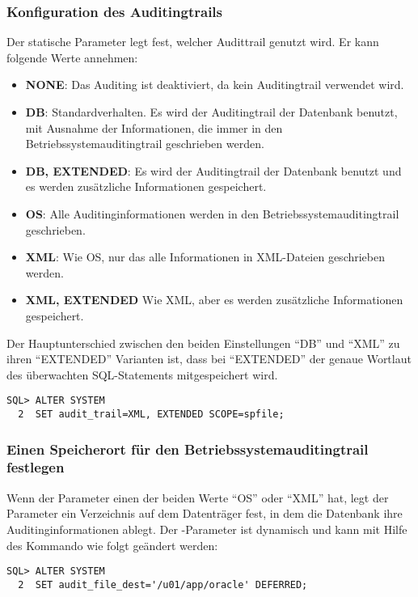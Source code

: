         \subsubsection{Konfiguration des Auditingtrails}
          Der statische Parameter  legt fest, welcher Audittrail genutzt wird. Er kann folgende Werte annehmen:
          \begin{itemize}
            \item \textbf{NONE}: Das Auditing ist deaktiviert, da kein Auditingtrail verwendet wird.
            \item \textbf{DB}: Standardverhalten. Es wird der Auditingtrail der Datenbank benutzt, mit Ausnahme der Informationen, die immer in den Betriebssystemauditingtrail geschrieben werden.
            \item \textbf{DB, EXTENDED}: Es wird der Auditingtrail der Datenbank benutzt und es werden zus\"atzliche Informationen gespeichert.
            \item \textbf{OS}: Alle Auditinginformationen werden in den Betriebssystemauditingtrail geschrieben.
            \item \textbf{XML}: Wie OS, nur das alle Informationen in XML-Dateien geschrieben werden.
            \item \textbf{XML, EXTENDED} Wie XML, aber es werden zus\"atzliche Informationen gespeichert.
          \end{itemize}
          \begin{merke}
            Der Hauptunterschied zwischen den beiden Einstellungen \enquote{DB} und \enquote{XML} zu ihren \enquote{EXTENDED} Varianten ist, dass bei \enquote{EXTENDED} der genaue Wortlaut des \"uberwachten SQL-Statements mitgespeichert wird.
          \end{merke}
          \begin{lstlisting}[caption={Der Parameter \parameter{audit\_trail}},label=admin800,language=oracle_sql]
SQL> ALTER SYSTEM
  2  SET audit_trail=XML, EXTENDED SCOPE=spfile;
          \end{lstlisting}
        \subsubsection{Einen Speicherort f\"ur den Betriebssystemauditingtrail festlegen}
          Wenn der Parameter  einen der beiden Werte \enquote{OS} oder \enquote{XML} hat, legt der Parameter  ein Verzeichnis auf dem Datentr\"ager fest, in dem die Datenbank ihre Auditinginformationen ablegt. Der -Parameter ist dynamisch und kann mit Hilfe des Kommando  wie folgt ge\"andert werden:
          \begin{lstlisting}[caption={Der Parameter \parameter{audit\_file\_dest}},label=admin801,language=oracle_sql]
SQL> ALTER SYSTEM
  2  SET audit_file_dest='/u01/app/oracle' DEFERRED;
          \end{lstlisting}
          \begin{literaturinternet}
            \item \cite{i2282157}
          \end{literaturinternet}

